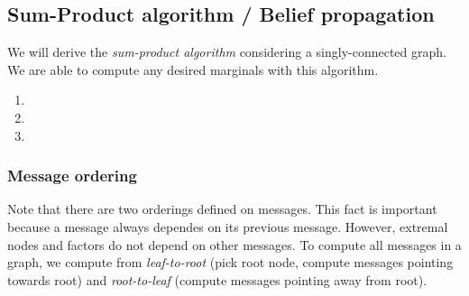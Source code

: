 \subsection{Sum-Product algorithm / Belief propagation}\label{sec:belief_propagation}
We will derive the \emph{sum-product algorithm} considering a singly-connected graph. %
We are able to compute any desired marginals with this algorithm. %
\begin{enumerate}
	\item {}
	\item {}
	\item {}
\end{enumerate}
\subsubsection{Message ordering}%
Note that there are two orderings defined on messages. %
This fact is important because a message always dependes on its previous message. %
However, extremal nodes and factors do not depend on other messages. %
To compute all messages in a graph, we compute from \emph{leaf-to-root} (pick root node, compute messages pointing towards root) and \emph{root-to-leaf} (compute messages pointing away from root). %
\\[.3cm]%
%
%
%

